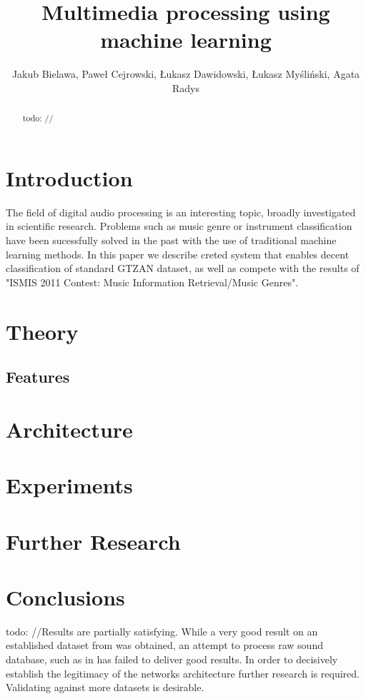 \documentclass[journal, a4paper]{IEEEtran}
\begin{document}
	\title{Multimedia processing using machine learning}
	\author{Jakub Bielawa, Paweł Cejrowski, Łukasz Dawidowski, Łukasz Myśliński, Agata Radys}
	\maketitle

\begin{abstract}
todo:
// 
\end{abstract}

\section{Introduction}
The field of digital audio processing is an interesting topic, broadly investigated in scientific research. 
Problems such as music genre or instrument classification have been sucessfully solved in the past with the use of traditional machine learning methods. 
In this paper we describe creted system that enables decent classification of standard GTZAN dataset, as well as compete with the results of "ISMIS 2011 Contest: Music Information Retrieval/Music Genres". 

\section{Theory}


\subsection{Features}



\section{Architecture}


	
\section{Experiments}


\section{Further Research}


\section{Conclusions}

todo:
//Results are partially satisfying. While a very good result on an established dataset from \cite{data} was obtained, an attempt to process raw sound database, such as in \cite{gztan} has failed to deliver good results. In order to decisively establish the legitimacy of the networks architecture further research is required. Validating against more datasets is desirable.

{}

\end{document}
